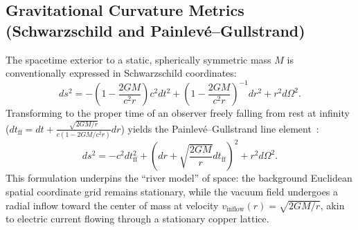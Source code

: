 \subsection{Gravitational Curvature Metrics (Schwarzschild and Painlev\'e--Gullstrand)}
The spacetime exterior to a static, spherically symmetric mass $M$ is conventionally expressed in Schwarzschild coordinates:
\begin{equation}
    ds^2 = -\left(1 - \frac{2GM}{c^2 r}\right) c^2 dt^2 + \left(1 - \frac{2GM}{c^2 r}\right)^{-1} dr^2 + r^2 d\Omega^2.
    \label{eq:schwarzschild_standart}
\end{equation}
Transforming to the proper time of an observer freely falling from rest at infinity ($dt_{\mathrm{ff}} = dt + \frac{\sqrt{2GM/r}}{c(1 - 2GM/c^2 r)} dr$) yields the Painlev\'e--Gullstrand line element~\cite{painleve1921, gullstrand1922}:
\begin{equation}
    ds^2 = -c^2 dt_{\mathrm{ff}}^2 + \left( dr + \sqrt{\frac{2GM}{r}} dt_{\mathrm{ff}} \right)^2 + r^2 d\Omega^2.
    \label{eq:painleve_standart}
\end{equation}
This formulation underpins the ``river model'' of space: the background Euclidean spatial coordinate grid remains stationary, while the vacuum field undergoes a radial inflow toward the center of mass at velocity $v_{\mathrm{inflow}}(r) = \sqrt{2GM/r}$, akin to electric current flowing through a stationary copper lattice.
